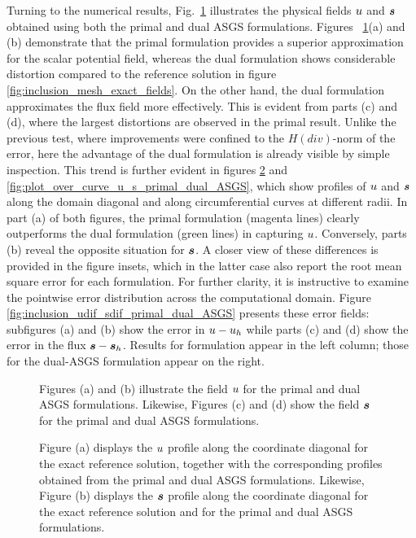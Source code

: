 Turning to the numerical results, Fig.~\ref{fig:inclusion_u_s_primal_dual_ASGS} illustrates
the physical fields $u$ and $\bm{s}$ obtained using both the primal and dual ASGS formulations.
Figures ~\ref{fig:inclusion_u_s_primal_dual_ASGS}(a) and (b) demonstrate that the primal
formulation provides a superior approximation for the scalar potential field, whereas the dual 
formulation shows considerable distortion compared to the reference solution in figure 
\ref{fig:inclusion_mesh_exact_fields}. On the other hand, the dual formulation approximates the 
flux field more effectively. This is evident from parts (c) and (d), where the largest distortions 
are observed in the primal result. Unlike the previous test, where improvements were confined to 
the $H(div)$-norm of the error, here the advantage of the dual formulation is already visible by 
simple inspection. This trend is further evident in figures
\ref{fig:plot_over_line_u_s_primal_dual_ASGS} and \ref{fig:plot_over_curve_u_s_primal_dual_ASGS}, 
which show profiles of $u$ and $\bm{s}$ along the domain diagonal and along circumferential curves 
at different radii. In
part (a) of both figures, the primal formulation (magenta lines) clearly outperforms the
dual formulation (green lines) in capturing $u$. Conversely, parts (b) reveal 
the opposite situation for $\bm{s}$. A closer view of these differences is provided in the figure
insets, which in the latter case also report the root mean square error for each formulation. 
For further clarity, it is instructive to examine the pointwise error distribution across the
computational domain. Figure \ref{fig:inclusion_udif_sdif_primal_dual_ASGS} presents these error
fields: subfigures (a) and (b) show the error in $u - u_h$ while parts (c) and (d) show the
error in the flux $\bm{s} - \bm{s}_h$. Results for formulation appear in the left column; those for the
dual-ASGS formulation appear on the right.
\begin{figure}[ht!!]
	\centering
	\caption{Figures (a) and (b) illustrate the field $u$ for the primal and dual ASGS formulations. Likewise, Figures (c) and (d) show the field $\bm{s}$ for the primal and dual ASGS formulations.}
	\fontsize{12pt}{10pt}\selectfont 
	\def\svgwidth{1.0\columnwidth}
	
	\label{fig:inclusion_u_s_primal_dual_ASGS}
\end{figure}

\begin{figure}[ht!!]
	\centering
	\caption{Figure (a) displays the $u$ profile along the coordinate diagonal for the exact reference solution, together with the corresponding profiles obtained from the primal and dual ASGS formulations. Likewise, Figure (b) displays the $\bm{s}$ profile along the coordinate diagonal for the exact reference solution and for the primal and dual ASGS formulations.}
	\fontsize{12pt}{10pt}\selectfont 
	\def\svgwidth{0.8\columnwidth}
	
	\label{fig:plot_over_line_u_s_primal_dual_ASGS}
\end{figure}


